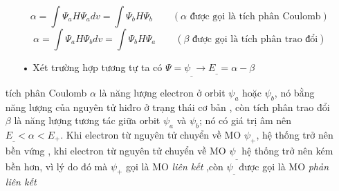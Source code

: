 \begin{enumerate}
\begin{itemize}
\begin{equation}
\alpha =\int\Psi_a H \Psi_a dv =\int\Psi_b H \Psi_b \qquad  \left(\alpha \text{ được gọi là tích phân Coulomb}\right)
\end{equation}
\begin{equation}
\alpha =\int\Psi_a H \Psi_b dv =\int\Psi_b H \Psi_a\qquad  \left(\beta\text{ được gọi là tích phân trao đổi}\right)
\end{equation}
\item[•] Xét trường hợp tương tự ta có $\Psi =\psi_\_ \rightarrow E_\_=\alpha - \beta$
\end{itemize}
tích phân Coulomb $\alpha$ là năng lượng electron ở orbit $\psi_a$ hoặc $\psi_b$, nó bằng năng lượng của nguyên tử hiđro ở trạng thái cơ bản , còn tích phân trao đổi $\beta$ là năng lượng tương tác giữa orbit $\psi_a$ và $\psi_b$; nó có giá trị âm nên $E_\_ < \alpha < E_+$. Khi electron từ nguyên tử chuyển về MO $\psi_+$, hệ thống trở nên bền vứng , khi electron từ nguyên tử chuyển về MO $\psi_\_$ hệ thống trở nên kém bền hơn, vì lý do đó mà  $\psi_+$ gọi là MO \emph{liên kết} ,còn $\psi_\_$ được gọi là MO \emph{phản liên kết}
\end{enumerate}
